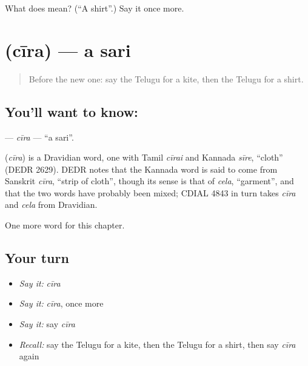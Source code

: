 \begin{tcolorbox}[breakable,colback=teal!4,colframe=teal!35!black,title={Before you move on}]
What does  mean? (\textquotedblleft{}A shirt\textquotedblright{}.) Say it once more.
\end{tcolorbox}
\section[\texorpdfstring{\te{చీర} (cīra)}{చీర (cīra)}]{ (cīra) — a sari}

\label{lesson:TE-C114-cira}



\begin{quote}
Before the new one: say the Telugu for a kite, then the Telugu for a shirt.
\end{quote}

\subsection*{You'll want to know: }
\textbf{} — \emph{cīra} — \textquotedblleft{}a sari\textquotedblright{}.

\begin{cousinweb}
\textbf{} (\emph{cīra}) is a Dravidian word, one with Tamil \emph{cīrai} and Kannada \emph{sīre}, \textquotedblleft{}cloth\textquotedblright{} (DEDR 2629). DEDR notes that the Kannada word is said to come from Sanskrit \emph{cīra}, \textquotedblleft{}strip of cloth\textquotedblright{}, though its sense is that of \emph{cela}, \textquotedblleft{}garment\textquotedblright{}, and that the two words have probably been mixed; CDIAL 4843 in turn takes \emph{cīra} and \emph{cela} from Dravidian.
\end{cousinweb}

\begin{grammarlens}[title={What you've built}]
One more word for this chapter.
\end{grammarlens}

\subsection*{Your turn}
\begin{itemize}
\raggedright
  \item \emph{Say it:} \emph{cīra}
  \item \emph{Say it:} \emph{cīra}, once more
  \item \emph{Say it:} say \emph{cīra}
  \item \emph{Recall:} say the Telugu for a kite, then the Telugu for a shirt, then say \emph{cīra} again
\end{itemize}

